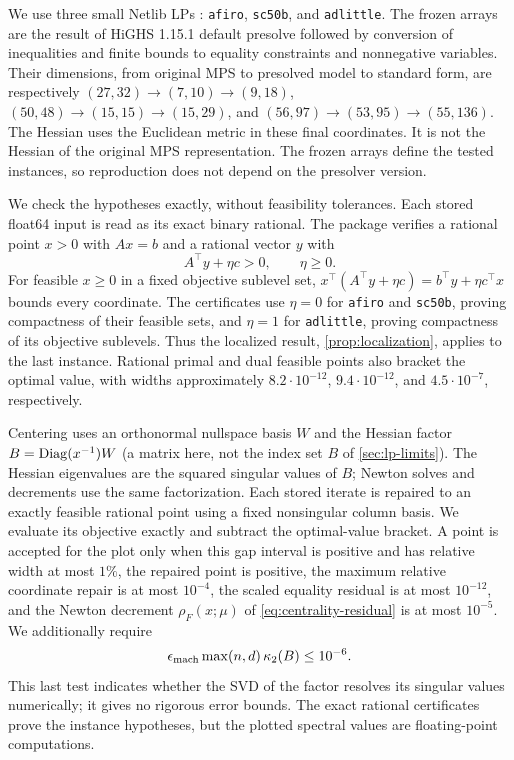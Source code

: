 We use three small Netlib LPs \citep{netlib}: \texttt{afiro},
\texttt{sc50b}, and \texttt{adlittle}. The frozen arrays are the result
of HiGHS 1.15.1 default presolve followed by conversion of inequalities and finite bounds to equality constraints
and nonnegative variables.
Their dimensions, from original MPS to presolved model to standard form,
are respectively
$(27,32)\to(7,10)\to(9,18)$,
$(50,48)\to(15,15)\to(15,29)$, and
$(56,97)\to(53,95)\to(55,136)$.
The Hessian uses the Euclidean metric in these final coordinates.
It is not the Hessian of the original MPS representation. The frozen
arrays define the tested instances, so reproduction does not depend on
the presolver version.

We check the hypotheses exactly, without feasibility tolerances. Each
stored float64 input is read as its exact binary rational.
The package verifies a rational point $x>0$ with $Ax=b$ and a rational
vector $y$ with
\[
 A^\top y+\eta c>0,\qquad \eta\geq0.
\]
For feasible $x\geq0$ in a fixed objective sublevel set,
$x^\top(A^\top y+\eta c)=b^\top y+\eta c^\top x$ bounds every
coordinate. The certificates use $\eta=0$ for \texttt{afiro} and
\texttt{sc50b}, proving compactness of their feasible sets, and
$\eta=1$ for \texttt{adlittle}, proving compactness of its objective
sublevels. Thus the localized result, \cref{prop:localization}, applies
to the last instance. Rational primal and dual feasible points also
bracket the optimal value, with widths approximately $8.2\cdot10^{-12}$,
$9.4\cdot10^{-12}$, and $4.5\cdot10^{-7}$, respectively.

Centering uses an orthonormal nullspace basis $W$ and the Hessian factor
$B=\operatorname{Diag}(x^{-1})W$ (a matrix here, not the index set $B$ of
\cref{sec:lp-limits}). The Hessian eigenvalues are the squared singular values of $B$;
Newton solves and decrements use the same factorization.
Each stored iterate is repaired to an exactly feasible rational point
using a fixed nonsingular column basis. We evaluate its objective
exactly and subtract the optimal-value bracket. A point is
accepted for the plot only when this gap interval is positive and
has relative width at most $1\%$, the repaired point is positive,
the maximum relative coordinate repair is at most $10^{-4}$, the
scaled equality residual is at most $10^{-12}$, and the Newton
decrement $\rho_F(x;\mu)$ of \eqref{eq:centrality-residual} is at
most $10^{-5}$. We additionally require
\[
 \epsilon_{\rm mach}\max(n,d)\,\kappa_2(B)\leq10^{-6}.
\]
This last test indicates whether the SVD of the factor resolves its
singular values numerically; it gives no rigorous error bounds. The
exact rational certificates prove the instance hypotheses, but the
plotted spectral values are floating-point computations.

